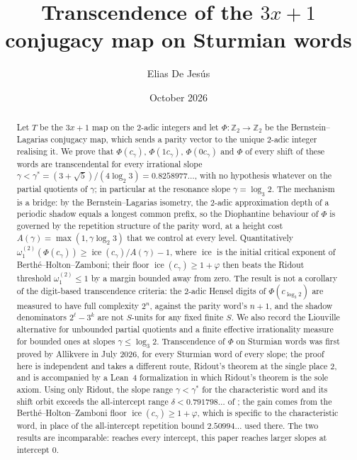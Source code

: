\documentclass[11pt,reqno]{amsart}
\theoremstyle{plain}
\theoremstyle{definition}
\DeclareMathOperator{\ice}{ice}
\newcommand{\Z}{\mathbb{Z}}
\newcommand{\Zt}{\Z_2}
\newcommand{\PH}{\Phi}
\newcommand{\gs}{\gamma^{*}}
\newcommand{\Av}{A(\gamma)}
\newcommand{\om}{\omega_1^{(2)}}
\begin{document}
\title[Transcendence of the $3x+1$ conjugacy map on Sturmian words]
      {Transcendence of the $3x+1$ conjugacy map on Sturmian words}
\author{Elias De Jes\'us}
\address{Independent Researcher}
\date{October 2026}


\begin{abstract}
Let $T$ be the $3x+1$ map on the $2$-adic integers and let $\PH\colon\Zt\to\Zt$ be the
Bernstein--Lagarias conjugacy map, which sends a parity vector to the unique $2$-adic integer
realising it. We prove that $\PH(c_\gamma)$, $\PH(1c_\gamma)$, $\PH(0c_\gamma)$ and $\PH$ of every
shift of these words are transcendental for every irrational slope
$\gamma<\gs=(3+\sqrt5)/(4\log_2 3)=0.8258977\ldots$, with no hypothesis whatever on the partial
quotients of $\gamma$; in particular at the resonance slope $\gamma=\log_3 2$. The mechanism is a
bridge: by the Bernstein--Lagarias isometry, the $2$-adic approximation depth of a periodic shadow
equals a longest common prefix, so the Diophantine behaviour of $\PH$ is governed by the repetition
structure of the parity word, at a height cost $\Av=\max(1,\gamma\log_2 3)$ that we control at every
level. Quantitatively $\om(\PH(c_\gamma))\ge\ice(c_\gamma)/\Av-1$, where $\ice$ is the initial
critical exponent of Berth\'e--Holton--Zamboni; their floor $\ice(c_\gamma)\ge1+\varphi$ then beats
the Ridout threshold $\om\le1$ by a margin bounded away from zero. The result is not a corollary of
the digit-based transcendence criteria: the $2$-adic Hensel digits of $\PH(c_{\log_3 2})$ are
measured to have full complexity $2^n$, against the parity word's $n+1$, and the shadow denominators
$2^{\ell}-3^{k}$ are not $S$-units for any fixed finite $S$. We also record the Liouville
alternative for unbounded partial quotients and a finite effective irrationality measure for bounded
ones at slopes $\gamma\le\log_3 2$. Transcendence of $\PH$ on Sturmian words was first proved by
Allikvere \cite{Allikvere26} in July 2026, for every Sturmian word of every slope; the proof here
is independent and takes a different route, Ridout's theorem at the single place $2$, and is
accompanied by a Lean~4 formalization in which Ridout's theorem is the sole axiom. Using only
Ridout, the slope range $\gamma<\gs$ for the characteristic word and its shift orbit exceeds the
all-intercept range $\delta<0.791798\ldots$ of \cite[Theorem 4.4]{Allikvere26}; the gain comes
from the Berth\'e--Holton--Zamboni floor $\ice(c_\gamma)\ge1+\varphi$, which is specific to the
characteristic word, in place of the all-intercept repetition bound $2.50994\ldots$ used there.
The two results are incomparable: \cite[Theorem 4.4]{Allikvere26} reaches every intercept, this
paper reaches larger slopes at intercept $0$.
\end{abstract}
\end{document}
